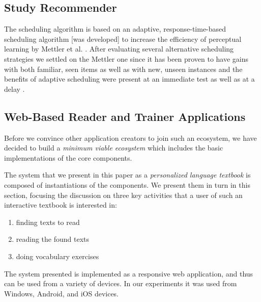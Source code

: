 
\subsection{Study Recommender}

The scheduling algorithm is based on an adaptive, response-time-based scheduling algorithm [was developed] to increase the efficiency of perceptual learning by Mettler et al. \cite{Mettler14-ARTS}. After evaluating several alternative scheduling strategies we settled on the Mettler one since it has been proven to have gains with both familiar, seen items as well as with new, unseen instances and the benefits of adaptive scheduling were present at an immediate test as well as at a delay \cite{Mettler14-ARTS}.


\subsection{Web-Based Reader and Trainer Applications}


Before we convince other application creators to join such an ecosystem, we have decided to build a {\em minimum viable ecosystem} which includes the basic implementations of the core components. 

The system that we present in this paper as a {\em personalized language textbook} is composed of instantiations of the components. We present them in turn in this section, focusing the discussion on three key activities that a user of such an interactive textbook is interested in: 

\begin{enumerate}
	\item finding texts to read
	\item reading the found texts
	\item doing vocabulary exercises
\end{enumerate}

\begin{added}
	
	The system presented is implemented as a responsive web application, and thus can be used from a variety of devices. In our experiments it was used from Windows, Android, and iOS devices.

\end{added}




